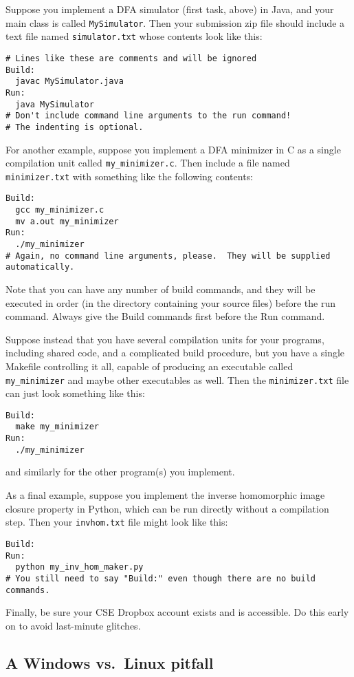 Suppose you implement a DFA simulator (first task, above) in Java,
and your main class is called \texttt{MySimulator}.
Then your submission zip file should include a text file named
\texttt{simulator.txt} whose contents look like this:
\begin{verbatim}
# Lines like these are comments and will be ignored
Build:
  javac MySimulator.java
Run:
  java MySimulator
# Don't include command line arguments to the run command!
# The indenting is optional.
\end{verbatim}
For another example, suppose you implement a DFA minimizer in C as a
single compilation unit called \texttt{my\_minimizer.c}.
Then include a file named \texttt{minimizer.txt} with something like
the following contents:
\begin{verbatim}
Build:
  gcc my_minimizer.c
  mv a.out my_minimizer
Run:
  ./my_minimizer
# Again, no command line arguments, please.  They will be supplied automatically.
\end{verbatim}
Note that you can have any number of build commands, and they will be
executed in order (in the directory containing your source files) before
the run command.
Always give the Build commands first before the Run command.

Suppose instead that you have several compilation units for your programs, including shared code, and a complicated build procedure, but you have a single Makefile controlling it all, capable of producing an executable called \texttt{my\_minimizer} and maybe other executables as well.  Then the \texttt{minimizer.txt} file can just look something like this:
\begin{verbatim}
Build:
  make my_minimizer
Run:
  ./my_minimizer
\end{verbatim}
and similarly for the other program(s) you implement.

As a final example, suppose you implement the inverse homomorphic image closure
property in Python, which can be run directly without a compilation step.
Then your \texttt{invhom.txt} file might look like this:
\begin{verbatim}
Build:
Run:
  python my_inv_hom_maker.py
# You still need to say "Build:" even though there are no build commands.
\end{verbatim}

Finally, be sure your CSE Dropbox account exists and is accessible.
Do this early on to avoid last-minute glitches.

\subsection*{A Windows vs.\ Linux pitfall}

